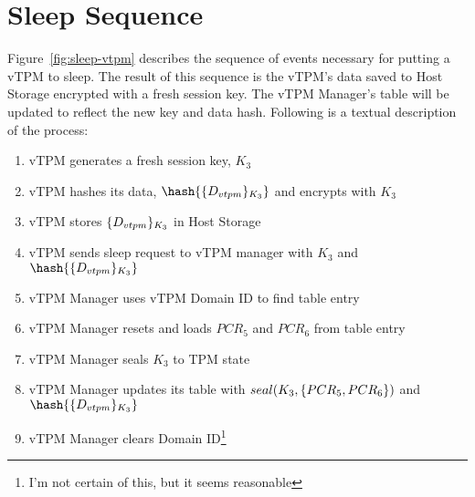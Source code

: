 \documentclass[10pt]{article}
\begin{document}
\section{Sleep Sequence}

Figure~\ref{fig:sleep-vtpm} describes the sequence of events necessary
for putting a vTPM to sleep.  The result of this sequence is the
vTPM's data saved to Host Storage encrypted with a fresh session key.
The vTPM Manager's table will be updated to reflect the new key and
data hash.  Following is a textual description of the process:

\begin{enumerate}
  \parskip=0pt\itemsep=0pt
\item vTPM generates a fresh session key, $K_{3}$
\item vTPM hashes its data, $\hash{\encrypt{D_{vtpm}}{K_3}}$ and encrypts with $K_{3}$
\item vTPM stores $\{D_{vtpm}\}_{K_{3}}$ in Host Storage
\item vTPM sends sleep request to vTPM manager with $K_{3}$ and
  $\hash{\encrypt{D_{vtpm}}{K_3}}$
\item vTPM Manager uses vTPM Domain ID to find table entry
\item vTPM Manager resets and loads $PCR_5$ and $PCR_6$ from table
  entry
\item vTPM Manager seals $K_{3}$ to TPM state
\item vTPM Manager updates its table with
  $seal(K_{3},\{PCR_5,PCR_6\})$ and $\hash{\encrypt{D_{vtpm}}{K_3}}$
\item vTPM Manager clears Domain ID\footnote{I'm not certain of this,
    but it seems reasonable}
\end{enumerate}
\end{document}
